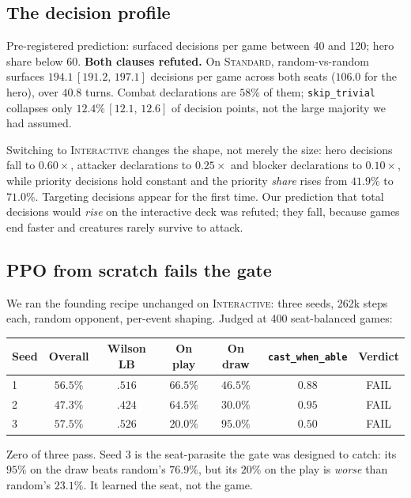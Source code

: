 \documentclass[11pt]{article}
\newcommand{\stddeck}{\textsc{Standard}}
\newcommand{\intdeck}{\textsc{Interactive}}
\newcommand{\ci}[2]{\,[#1,\,#2]}
\begin{document}
\subsection{The decision profile}
\label{sec:profile}

Pre-registered prediction: surfaced decisions per game between 40 and 120; hero share below 60. \textbf{Both clauses refuted.} On \stddeck, random-vs-random surfaces $194.1\ci{191.2}{197.1}$ decisions per game across both seats ($106.0$ for the hero), over $40.8$ turns. Combat declarations are $58\%$ of them; \texttt{skip\_trivial} collapses only $12.4\%\ci{12.1}{12.6}$ of decision points, not the large majority we had assumed.

Switching to \intdeck{} changes the shape, not merely the size: hero decisions fall to $0.60\times$, attacker declarations to $0.25\times$ and blocker declarations to $0.10\times$, while priority decisions hold constant and the priority \emph{share} rises from $41.9\%$ to $71.0\%$. Targeting decisions appear for the first time. Our prediction that total decisions would \emph{rise} on the interactive deck was refuted; they fall, because games end faster and creatures rarely survive to attack.

\subsection{PPO from scratch fails the gate}
\label{sec:c1}

We ran the founding recipe unchanged on \intdeck: three seeds, 262k steps each, random opponent, per-event shaping. Judged at 400 seat-balanced games:

\begin{center}\small
\begin{tabular}{lcccccc}
\toprule
Seed & Overall & Wilson LB & On play & On draw & \texttt{cast\_when\_able} & Verdict \\
\midrule
1 & $56.5\%$ & $.516$ & $66.5\%$ & $46.5\%$ & $0.88$ & FAIL \\
2 & $47.3\%$ & $.424$ & $64.5\%$ & $30.0\%$ & $0.95$ & FAIL \\
3 & $57.5\%$ & $.526$ & $20.0\%$ & $95.0\%$ & $0.50$ & FAIL \\
\bottomrule
\end{tabular}
\end{center}

Zero of three pass. Seed 3 is the seat-parasite the gate was designed to catch: its $95\%$ on the draw beats random's $76.9\%$, but its $20\%$ on the play is \emph{worse} than random's $23.1\%$. It learned the seat, not the game.
\end{document}
